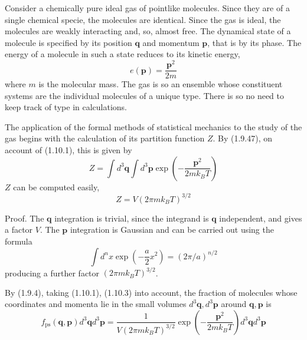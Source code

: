 \documentclass{article}
\begin{document}
Consider a chemically pure ideal gas of pointlike molecules. Since they are of a single chemical specie, the molecules are identical. Since the gas is ideal, the molecules are weakly interacting and, so, almost free. The dynamical state of a molecule is specified by its position $\boldsymbol{q}$ and momentum $\boldsymbol{p}$, that is by its phase. The energy of a molecule in such a state reduces to its kinetic energy,
$$
\begin{equation*}
e(\boldsymbol{p})=\frac{\boldsymbol{p}^{2}}{2 m} \tag{1.10.1}
\end{equation*}
$$
where $m$ is the molecular mass. The gas is so an ensemble whose constituent systems are the individual molecules of a unique type. There is so no need to keep track of type in calculations.

The application of the formal methods of statistical mechanics to the study of the gas begins with the calculation of its partition function $Z$. By (1.9.47), on account of (1.10.1), this is given by
$$
\begin{equation*}
Z=\int d^{3} \boldsymbol{q} \int d^{3} \boldsymbol{p} \exp \left(-\frac{\boldsymbol{p}^{2}}{2 m k_{B} T}\right) \tag{1.10.2}
\end{equation*}
$$
$Z$ can be computed easily,
$$
\begin{equation*}
Z=V\left(2 \pi m k_{B} T\right)^{3 / 2} \tag{1.10.3}
\end{equation*}
$$

Proof. The $\boldsymbol{q}$ integration is trivial, since the integrand is $\boldsymbol{q}$ independent, and gives a factor $V$. The $\boldsymbol{p}$ integration is Gaussian and can be carried out using the formula
$$
\begin{equation*}
\int d^{n} x \exp \left(-\frac{a}{2} x^{2}\right)=(2 \pi / a)^{n / 2} \tag{1.10.4}
\end{equation*}
$$
producing a further factor $\left(2 \pi m k_{B} T\right)^{3 / 2}$.

By (1.9.4), taking (1.10.1), (1.10.3) into account, the fraction of molecules whose coordinates and momenta lie in the small volumes $d^{3} \boldsymbol{q}, d^{3} \boldsymbol{p}$ around $\boldsymbol{q}, \boldsymbol{p}$ is
$$
\begin{equation*}
f_{\mathrm{ps}}(\boldsymbol{q}, \boldsymbol{p}) d^{3} \boldsymbol{q} d^{3} \boldsymbol{p}=\frac{1}{V\left(2 \pi m k_{B} T\right)^{3 / 2}} \exp \left(-\frac{\boldsymbol{p}^{2}}{2 m k_{B} T}\right) d^{3} \boldsymbol{q} d^{3} \boldsymbol{p} \tag{1.10.5}
\end{equation*}
$$
\end{document}
